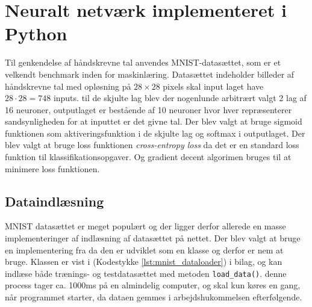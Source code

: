 \documentclass{article}
\newcommand{\listingref}[1]{(Kodestykke \ref{#1})}
\begin{document}
\section{Neuralt netværk implementeret i Python}
Til genkendelse af håndskrevne tal anvendes MNIST-datasættet, som er et velkendt benchmark inden for maskinlæring. Datasættet indeholder billeder af håndskrevne tal med opløsning på $28\times28$ pixels skal input laget have $28\cdot28=748$ inputs. til de skjulte lag blev der nogenlunde arbitrært valgt 2 lag af 16 neuroner, outputlaget er bestående af 10 neuroner hvor hver repræsenterer sandsynligheden for at inputtet er det givne tal. Der blev valgt at bruge sigmoid funktionen som aktiveringsfunktion i de skjulte lag og softmax i outputlaget. Der blev valgt at bruge loss funktionen \textit{cross-entropy loss} da det er en standard loss funktion til klassifikationsopgaver. Og gradient decent algorimen bruges til at minimere loss funktionen.
\subsection{Dataindlæsning}
MNIST datasættet er meget populært og der ligger derfor allerede en masse implementeringer af indlæsning af datasættet på nettet. Der blev valgt at bruge en implementering fra \parencite{Khodabakhsh} da den er udviklet som en klasse og derfor er nem at bruge. Klassen er vist i \listingref{lst:mnist_dataloader} i bilag, og kan indlæse både trænings- og testdatasættet med metoden \texttt{load\_data()}. denne process tager ca. 1000ms på en almindelig computer, og skal kun køres en gang, når programmet starter, da dataen gemmes i arbejdshukommelsen efterfølgende. 
\end{document}
